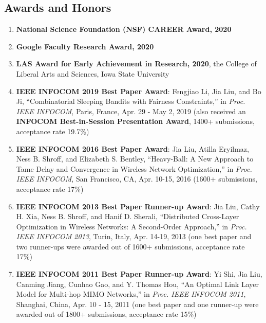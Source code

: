 \documentclass[overlapped,line,letterpaper]{res1}
\begin{document}
\begin{resume}
\section{\bf \large Awards and Honors}
\vspace{.2in}
\begin{enumerate}
\vspace{.05in}
\item {\bf National Science Foundation (NSF) CAREER Award, 2020}

\vspace{.05in}
\item {\bf Google Faculty Research Award, 2020}

\vspace{.05in}
\item {\bf LAS Award for Early Achievement in Research, 2020}, the College of Liberal Arts and Sciences, Iowa State University

\vspace{.05in}
\item {\bf IEEE INFOCOM 2019 Best Paper Award}: Fengjiao Li, Jia Liu, and Bo Ji, ``Combinatorial Sleeping Bandits with Fairness Constraints,'' in {\em Proc. IEEE INFOCOM}, Paris, France, Apr. 29 - May 2, 2019 (also received an {\bf INFOCOM Best-in-Session Presentation Award}, 1400+ submissions, acceptance rate 19.7\%)

\vspace{.05in}
\item {\bf IEEE INFOCOM 2016 Best Paper Award}: Jia Liu, Atilla Eryilmaz, Ness B. Shroff, and Elizabeth S. Bentley, ``Heavy-Ball: A New Approach to Tame Delay and Convergence in Wireless Network Optimization,'' in {\em Proc. IEEE INFOCOM}, San Francisco, CA, Apr. 10-15, 2016 (1600+ submissions, acceptance rate 17\%)

\vspace{.05in}
\item {\bf IEEE INFOCOM 2013 Best Paper Runner-up Award}: Jia Liu, Cathy H. Xia, Ness B. Shroff, and Hanif D. Sherali, ``Distributed Cross-Layer Optimization in Wireless Networks: A Second-Order Approach,'' in {\em Proc. IEEE INFOCOM 2013}, Turin, Italy, Apr. 14-19, 2013 (one best paper and two runner-ups were awarded out of 1600+ submissions, acceptance rate 17\%)

\vspace{.05in}
\item {\bf IEEE INFOCOM 2011 Best Paper Runner-up Award}: Yi Shi, Jia Liu, Canming Jiang, Cunhao Gao, and Y. Thomas Hou, ``An Optimal Link Layer Model for Multi-hop MIMO Networks,'' in {\em Proc. IEEE INFOCOM 2011}, Shanghai, China, Apr. 10 - 15, 2011 (one best paper and one runner-up were awarded out of 1800+ submissions, acceptance rate 15\%)


\end{enumerate}
\end{resume}
\end{document}
